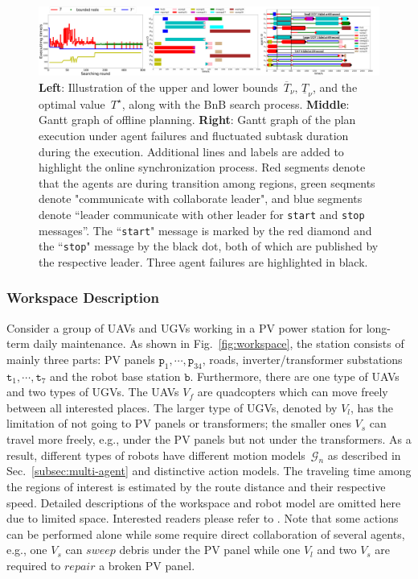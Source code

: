   \begin{figure}
    \centering
        \includegraphics[width=1\textwidth]{figures/simulation/taskfinal/mixed_poset.pdf}
    \caption{\textbf{Left}: Illustration of the upper and lower
bounds~$\overline{T}_\nu,\,\underline{T}_\nu$, and the optimal value~$T^\star$,
along with the BnB search process.
\textbf{Middle}: Gantt graph of offline planning.
\textbf{Right}: Gantt graph of the plan execution under agent failures and fluctuated subtask duration during the execution.
Additional lines and labels are added to highlight the online synchronization process. Red segments denote that the agents
are during transition among regions, green seqments denote "communicate
with collaborate leader", and blue segments denote
``leader communicate with other leader for \texttt{start} and \texttt{stop} messages”.
The ``\texttt{start}" message is marked by the red diamond and the ``\texttt{stop}" message
by the black dot, both of which are published by the respective leader.
Three agent failures are highlighted in black.
    }
\label{fig:task2-bnb}
\end{figure}

\subsubsection{Workspace Description}\label{subsubsec:ws}

Consider a group of UAVs and UGVs working in a PV power station for
long-term daily maintenance.
As shown in Fig.~\ref{fig:workspace},
the station consists of mainly three parts: PV panels $\texttt{p}_1,\cdots,\texttt{p}_{34}$, roads,
inverter/transformer substations $\texttt{t}_1,\cdots,\texttt{t}_7$ and the robot base station $\texttt{b}$.
Furthermore, there are one type of UAVs and two types of UGVs.
The UAVs $V_f$ are quadcopters which can move freely between all interested places.
The larger type of UGVs, denoted by $V_l$, has the limitation of not going to PV panels or transformers;
the smaller ones $V_s$ can travel more freely, e.g., under the PV panels but not under the transformers.
As a result, different types of robots have different motion
models~$\mathcal{G}_n$ as described in Sec.~\ref{subsec:multi-agent}
and distinctive action models.
The traveling time among the regions of interest is estimated by the route
distance and their respective speed.
Detailed descriptions of the workspace and robot model are omitted here due to limited space. 
Interested readers please refer to \citep{liu2022arxiv}.
Note that some actions can be performed alone while some require direct
collaboration of several agents,
e.g., one $V_s$ can $sweep$ debris under the PV panel while one $V_l$
and two $V_s$ are required to $repair$ a broken PV panel.







